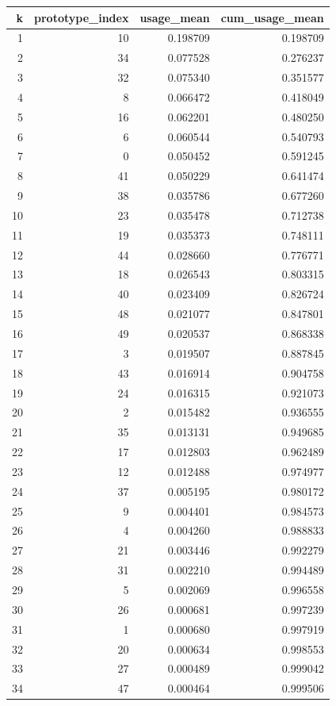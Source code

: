 \begin{tabular}{rrrr}
\toprule
k & prototype_index & usage_mean & cum_usage_mean \\
\midrule
1 & 10 & 0.198709 & 0.198709 \\
2 & 34 & 0.077528 & 0.276237 \\
3 & 32 & 0.075340 & 0.351577 \\
4 & 8 & 0.066472 & 0.418049 \\
5 & 16 & 0.062201 & 0.480250 \\
6 & 6 & 0.060544 & 0.540793 \\
7 & 0 & 0.050452 & 0.591245 \\
8 & 41 & 0.050229 & 0.641474 \\
9 & 38 & 0.035786 & 0.677260 \\
10 & 23 & 0.035478 & 0.712738 \\
11 & 19 & 0.035373 & 0.748111 \\
12 & 44 & 0.028660 & 0.776771 \\
13 & 18 & 0.026543 & 0.803315 \\
14 & 40 & 0.023409 & 0.826724 \\
15 & 48 & 0.021077 & 0.847801 \\
16 & 49 & 0.020537 & 0.868338 \\
17 & 3 & 0.019507 & 0.887845 \\
18 & 43 & 0.016914 & 0.904758 \\
19 & 24 & 0.016315 & 0.921073 \\
20 & 2 & 0.015482 & 0.936555 \\
21 & 35 & 0.013131 & 0.949685 \\
22 & 17 & 0.012803 & 0.962489 \\
23 & 12 & 0.012488 & 0.974977 \\
24 & 37 & 0.005195 & 0.980172 \\
25 & 9 & 0.004401 & 0.984573 \\
26 & 4 & 0.004260 & 0.988833 \\
27 & 21 & 0.003446 & 0.992279 \\
28 & 31 & 0.002210 & 0.994489 \\
29 & 5 & 0.002069 & 0.996558 \\
30 & 26 & 0.000681 & 0.997239 \\
31 & 1 & 0.000680 & 0.997919 \\
32 & 20 & 0.000634 & 0.998553 \\
33 & 27 & 0.000489 & 0.999042 \\
34 & 47 & 0.000464 & 0.999506 \\

\end{tabular}
